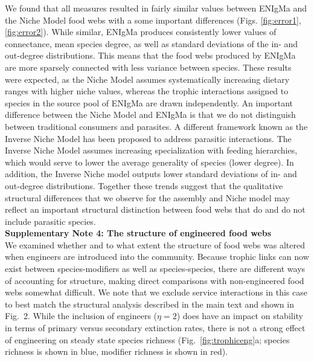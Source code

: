 \documentclass[onecolumn,preprintnumbers,amsmath,amssymb,superscriptaddress]{revtex4-1}
\begin{document}
\begin{bibunit}
We found that all measures resulted in fairly similar values between ENIgMa and the Niche Model food webs with a some important differences (Figs. \ref{fig:error1},\ref{fig:error2}).
While similar, ENIgMa produces consistently lower values of connectance, mean species degree, as well as standard deviations of the in- and out-degree distributions.
This means that the food webs produced by ENIgMa are more sparsely connected with less variance between species.
These results were expected, as the Niche Model assumes systematically increasing dietary ranges with higher niche values, whereas the trophic interactions assigned to species in the source pool of ENIgMa are drawn independently.
An important difference between the Niche Model and ENIgMa is that we do not distinguish between traditional consumers and parasites.
A different framework known as the Inverse Niche Model \cite{Warren2010} has been proposed to address parasitic interactions.
The Inverse Niche Model assumes increasing specialization with feeding hierarchies, which would serve to lower the average generality of species (lower degree).
In addition, the Inverse Niche model outputs lower standard deviations of in- and out-degree distributions.
Together these trends suggest that the qualitative structural differences that we observe for the assembly and Niche model may reflect an important structural distinction between food webs that do and do not include parasitic species.\\

\noindent \textbf{Supplementary Note 4: The structure of engineered food webs}\\
We examined whether and to what extent the structure of food webs was altered when engineers are introduced into the community.
Because trophic links can now exist between species-modifiers as well as species-species, there are different ways of accounting for structure, making direct comparisons with non-engineered food webs somewhat difficult.
We note that we exclude service interactions in this case to best match the structural analysis described in the main text and shown in Fig.\ 2.
While the inclusion of engineers ($\eta = 2$) does have an impact on stability in terms of primary versus secondary extinction rates, there is not a strong effect of engineering on steady state species richness (Fig.\ \ref{fig:trophiceng}a; species richness is shown in blue, modifier richness is shown in red).


\end{bibunit}
\end{document}
